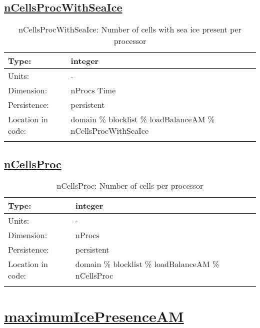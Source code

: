 \subsection[nCellsProcWithSeaIce]{\hyperref[sec:var_tab_loadBalanceAM]{nCellsProcWithSeaIce}}
\label{subsec:var_sec_loadBalanceAM_nCellsProcWithSeaIce}
\begin{center}
\begin{longtable}{| p{2.0in} | p{4.0in} |}
        \hline 
        Type: & integer \\
        \hline 
        Units: & \si{-} \\
        \hline 
        Dimension: & nProcs Time \\
        \hline 
        Persistence: & persistent \\
        \hline 
         Location in code: & domain \% blocklist \% loadBalanceAM \% nCellsProcWithSeaIce \\
         \hline 
    \caption{nCellsProcWithSeaIce: Number of cells with sea ice present per processor}
\end{longtable}
\end{center}
\subsection[nCellsProc]{\hyperref[sec:var_tab_loadBalanceAM]{nCellsProc}}
\label{subsec:var_sec_loadBalanceAM_nCellsProc}
\begin{center}
\begin{longtable}{| p{2.0in} | p{4.0in} |}
        \hline 
        Type: & integer \\
        \hline 
        Units: & \si{-} \\
        \hline 
        Dimension: & nProcs \\
        \hline 
        Persistence: & persistent \\
        \hline 
         Location in code: & domain \% blocklist \% loadBalanceAM \% nCellsProc \\
         \hline 
    \caption{nCellsProc: Number of cells per processor}
\end{longtable}
\end{center}
\section[maximumIcePresenceAM]{\hyperref[sec:var_tab_maximumIcePresenceAM]{maximumIcePresenceAM}}
\label{sec:var_sec_maximumIcePresenceAM}
